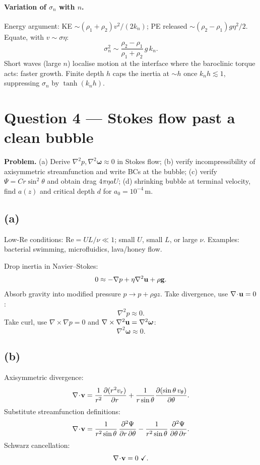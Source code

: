 \documentclass[11pt]{article}
\newcommand{\pd}[2]{\frac{\partial #1}{\partial #2}}
\begin{document}
\paragraph{Variation of $\sigma_n$ with $n$.} Energy argument: KE $\sim (\rho_1+\rho_2)v^2/(2k_n)$; PE released $\sim (\rho_2-\rho_1)g\eta^2/2$. Equate, with $v\sim\sigma\eta$:
\[ \sigma_n^2 \sim \frac{\rho_2-\rho_1}{\rho_1+\rho_2}\,g\,k_n. \]
Short waves (large $n$) localise motion at the interface where the baroclinic torque acts: faster growth. Finite depth $h$ caps the inertia at $\sim h$ once $k_n h\lesssim 1$, suppressing $\sigma_n$ by $\tanh(k_n h)$.

\section*{Question 4 --- Stokes flow past a clean bubble}

\textbf{Problem.} (a) Derive $\nabla^2 p,\nabla^2\bm\omega\approx 0$ in Stokes flow; (b) verify incompressibility of axisymmetric streamfunction and write BCs at the bubble; (c) verify $\Psi=Cr\sin^2\theta$ and obtain drag $4\pi\eta a U$; (d) shrinking bubble at terminal velocity, find $a(z)$ and critical depth $d$ for $a_0=10^{-4}\,$m.

\subsection*{(a)}

Low-Re conditions: $\mathrm{Re}=UL/\nu\ll 1$; small $U$, small $L$, or large $\nu$. Examples: bacterial swimming, microfluidics, lava/honey flow.

Drop inertia in Navier--Stokes:
\[ 0 \approx -\nabla p + \eta\nabla^2\vb u + \rho\vb g. \]
Absorb gravity into modified pressure $p\to p+\rho g z$. Take divergence, use $\nabla\!\cdot\!\vb u=0$:
\[ \boxed{\;\nabla^2 p \approx 0.\;} \]
Take curl, use $\nabla\times\nabla p=0$ and $\nabla\times\nabla^2\vb u=\nabla^2\bm\omega$:
\[ \boxed{\;\nabla^2\bm\omega \approx 0.\;} \]

\subsection*{(b)}

Axisymmetric divergence:
\[ \nabla\!\cdot\!\vb v = \frac{1}{r^2}\pd{(r^2 v_r)}{r} + \frac{1}{r\sin\theta}\pd{(\sin\theta\,v_\theta)}{\theta}. \]
Substitute streamfunction definitions:
\[ \nabla\!\cdot\!\vb v = \frac{1}{r^2\sin\theta}\,\frac{\partial^2\Psi}{\partial r\,\partial\theta} - \frac{1}{r^2\sin\theta}\,\frac{\partial^2\Psi}{\partial\theta\,\partial r}. \]
Schwarz cancellation:
\[ \nabla\!\cdot\!\vb v = 0\ \checkmark. \]
\end{document}
